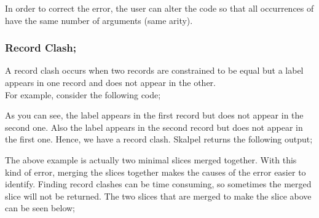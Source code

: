 \documentclass{report}
\begin{document}
\begin{itemize}
In order to correct the error, the user can alter the code so that all
occurrences of  have the same number of arguments
(same arity).


\newpage


\subsubsection {Record Clash;}

\subitem A record clash occurs when two records are constrained to be
equal but a label appears in one record and does not appear in the other.
\\
For example, consider the following code;


As you can see, the label  appears in the first record but does
not appear in the second one. Also the label  appears in
the second record but does not appear in the first one. Hence, we have
a record clash. Skalpel returns the following output;


The above example is actually two minimal slices merged together. With
this kind of error, merging the slices together makes the causes of
the error easier to identify. Finding record clashes can be time
consuming, so sometimes the merged slice will not be returned. The two
slices that are merged to make the slice above can be seen below;





\end{itemize}
\end{document}
